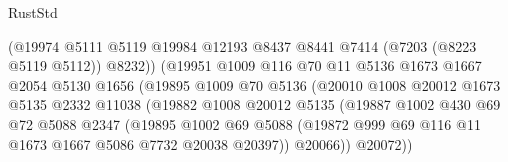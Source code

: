 \begin{lexlean}{RustStd}
\begin{coremodule}
                                (@19974
                                  @5111
                                  @5119
                                  @19984
                                  @12193
                                  @8437
                                  @8441
                                  @7414
                                  (@7203 (@8223 @5119 @5112))
                                  @8232))
                              (@19951
                                @1009
                                @116
                                @70
                                @11
                                @5136
                                @1673
                                @1667
                                @2054
                                @5130
                                @1656
                                (@19895
                                  @1009
                                  @70
                                  @5136
                                  (@20010
                                    @1008
                                    @20012
                                    @1673
                                    @5135
                                    @2332
                                    @11038
                                    (@19882
                                      @1008
                                      @20012
                                      @5135
                                      (@19887
                                        @1002
                                        @430
                                        @69
                                        @72
                                        @5088
                                        @2347
                                        (@19895
                                          @1002
                                          @69
                                          @5088
                                          (@19872
                                            @999
                                            @69
                                            @116
                                            @11
                                            @1673
                                            @1667
                                            @5086
                                            @7732
                                            @20038
                                            @20397))
                                        @20066))
                                    @20072))

\end{coremodule}
\end{lexlean}
